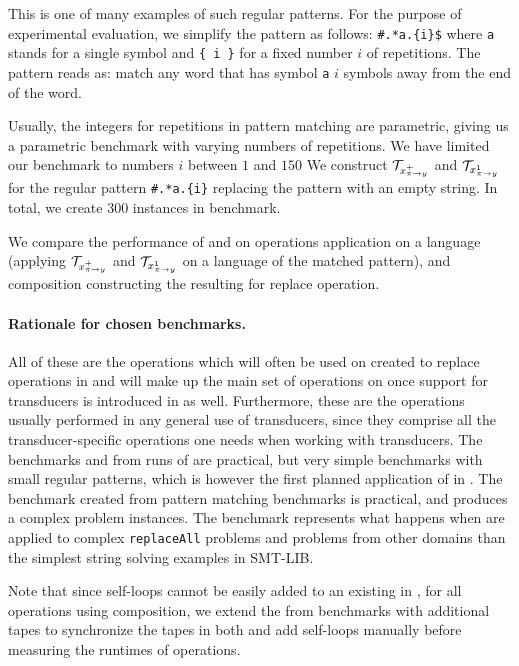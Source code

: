 This is one of many examples of such regular patterns.
For the purpose of experimental evaluation, we simplify the pattern as follows: \texttt{\#.*a.\{i\}\$} where \texttt{a} stands for a single symbol and \texttt{\{ i \}} for a fixed number $i$ of repetitions.
The pattern reads as: match any word that has symbol \texttt{a} $i$ symbols away from the end of the word.

Usually, the integers for repetitions in pattern matching are parametric, giving us a parametric benchmark \symbolFromEnd with varying numbers of repetitions.
We have limited our benchmark to numbers $i$ between $1$ and $150$
We construct $\mathcal{T}_{x^{+}_{\pi \rightarrow y}}$ and $\mathcal{T}_{x^{1}_{\pi \rightarrow y}}$ for the regular pattern \texttt{\#.*a.\{i\}} replacing the pattern with an empty string.
In total, we create $300$ instances in \symbolFromEnd benchmark.

We compare the performance of \mata and \mona on operations application on a language (applying $\mathcal{T}_{x^{+}_{\pi \rightarrow y}}$ and $\mathcal{T}_{x^{1}_{\pi \rightarrow y}}$ on a language of the matched pattern), and composition constructing the resulting \nft for replace operation.

\paragraph{Rationale for chosen benchmarks.}
All of these are the operations which will often be used on \nfts created to replace operations in \noodler and will make up the main set of operations on \nfts once support for transducers is introduced in \noodler as well.
Furthermore, these are the operations usually performed in any general use of transducers, since they comprise all the transducer-specific operations one needs when working with transducers.
The benchmarks \transducerPlus and \webapp from runs of \noodler are practical, but very simple benchmarks with small regular patterns, which is however the first planned application of \nfts in \mata. The benchmark \symbolFromEnd created from pattern matching benchmarks is practical, and produces a complex problem instances.
The benchmark represents what happens when \nfts are applied to complex \texttt{replaceAll} problems and problems from other domains than the simplest string solving examples in SMT-LIB.

Note that since self-loops cannot be easily added to an existing \nft in \mona, for all operations using composition, we extend the \nfts from benchmarks with additional tapes to synchronize the tapes in both \nfts and add self-loops manually before measuring the runtimes of operations.

